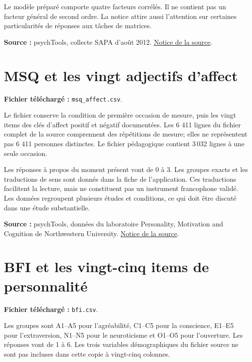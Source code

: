 \documentclass[
  french,
  11pt,
  a4paper,
  DIV=11,
  numbers=noendperiod]{scrreprt}
\begin{document}
Le modèle préparé comporte quatre facteurs corrélés. Il ne contient pas
un facteur général de second ordre. La notice attire aussi l'attention
sur certaines particularités de réponses aux tâches de matrices.

\textbf{Source :} psychTools, collecte SAPA d'août 2012.
\href{https://search.r-project.org/CRAN/refmans/psychTools/html/ability.html}{Notice
de la source}.

\section{MSQ et les vingt adjectifs
d'affect}\label{msq-et-les-vingt-adjectifs-daffect}

\textbf{Fichier téléchargé :} \texttt{msq\_affect.csv}.

Le fichier conserve la condition de première occasion de mesure, puis
les vingt items des clés d'affect positif et négatif documentées. Les 6
411 lignes du fichier complet de la source comprennent des répétitions
de mesure; elles ne représentent pas 6 411 personnes distinctes. Le
fichier pédagogique contient 3\,032 lignes à une seule occasion.

Les réponses à propos du moment présent vont de 0 à 3. Les groupes
exacts et les traductions de sens sont donnés dans la fiche de
l'application. Ces traductions facilitent la lecture, mais ne
constituent pas un instrument francophone validé. Les données regroupent
plusieurs études et conditions, ce qui doit être discuté dans une étude
substantielle.

\textbf{Source :} psychTools, données du laboratoire Personality,
Motivation and Cognition de Northwestern University.
\href{https://search.r-project.org/CRAN/refmans/psychTools/html/msqR.html}{Notice
de la source}.

\section{BFI et les vingt-cinq items de
personnalité}\label{bfi-et-les-vingt-cinq-items-de-personnalituxe9}

\textbf{Fichier téléchargé :} \texttt{bfi.csv}.

Les groupes sont A1--A5 pour l'agréabilité, C1--C5 pour la conscience,
E1--E5 pour l'extraversion, N1--N5 pour le neuroticisme et O1--O5 pour
l'ouverture. Les réponses vont de 1 à 6. Les trois variables
démographiques du fichier source ne sont pas incluses dans cette copie à
vingt-cinq colonnes.
\end{document}
